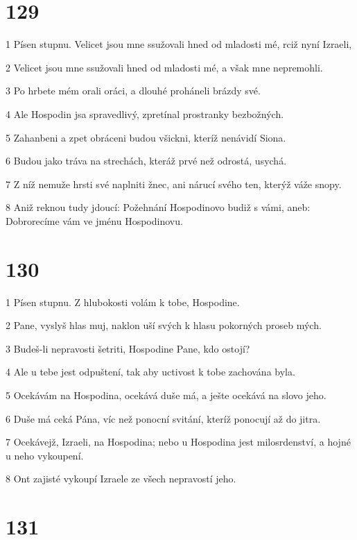 \chapter{129}

\par 1 Písen stupnu. Velicet jsou mne ssužovali hned od mladosti mé, rciž nyní Izraeli,
\par 2 Velicet jsou mne ssužovali hned od mladosti mé, a však mne nepremohli.
\par 3 Po hrbete mém orali oráci, a dlouhé proháneli brázdy své.
\par 4 Ale Hospodin jsa spravedlivý, zpretínal prostranky bezbožných.
\par 5 Zahanbeni a zpet obráceni budou všickni, kteríž nenávidí Siona.
\par 6 Budou jako tráva na strechách, kteráž prvé než odrostá, usychá.
\par 7 Z níž nemuže hrsti své naplniti žnec, ani nárucí svého ten, kterýž váže snopy.
\par 8 Aniž reknou tudy jdoucí: Požehnání Hospodinovo budiž s vámi, aneb: Dobrorecíme vám ve jménu Hospodinovu.

\chapter{130}

\par 1 Písen stupnu. Z hlubokosti volám k tobe, Hospodine.
\par 2 Pane, vyslyš hlas muj, naklon uší svých k hlasu pokorných proseb mých.
\par 3 Budeš-li nepravosti šetriti, Hospodine Pane, kdo ostojí?
\par 4 Ale u tebe jest odpuštení, tak aby uctivost k tobe zachována byla.
\par 5 Ocekávám na Hospodina, ocekává duše má, a ješte ocekává na slovo jeho.
\par 6 Duše má ceká Pána, víc než ponocní svitání, kteríž ponocují až do jitra.
\par 7 Ocekávejž, Izraeli, na Hospodina; nebo u Hospodina jest milosrdenství, a hojné u neho vykoupení.
\par 8 Ont zajisté vykoupí Izraele ze všech nepravostí jeho.

\chapter{131}

